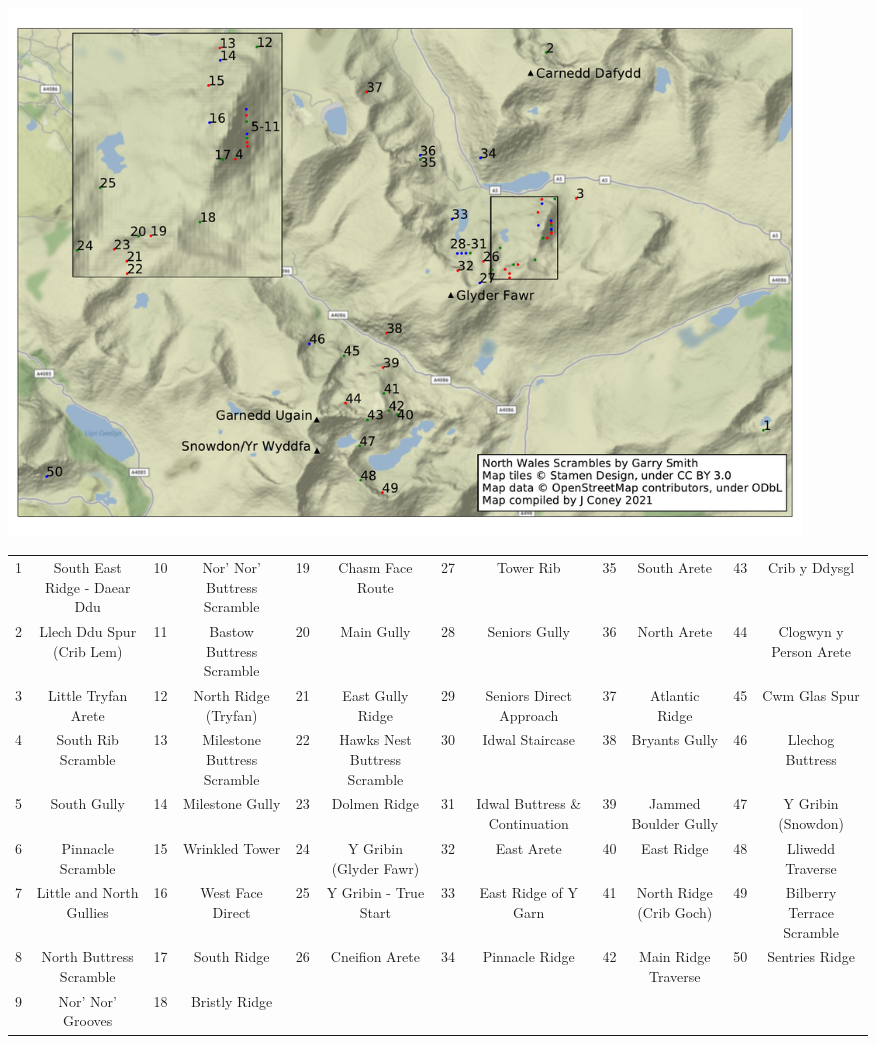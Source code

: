 \documentclass{article}
\begin{document}
\begin{centering}
\includegraphics[width=210mm]{scrambles_summits.pdf}

\tiny
\begin{tabular}{cc|cc|cc|cc|cc|cc}
1&	South East Ridge - Daear Ddu &	10	&Nor' Nor' Buttress Scramble&	19&	Chasm Face Route&	27&	Tower Rib&	35&	South Arete	&43&	Crib y Ddysgl\\
2&	Llech Ddu Spur (Crib Lem)&	11&	Bastow Buttress Scramble&	20&	Main Gully&	28&	Seniors Gully&	36&	North Arete&	44&	Clogwyn y Person Arete\\
3&	Little Tryfan Arete&	12&	North Ridge (Tryfan)&	21&	East Gully Ridge&	29&	Seniors Direct Approach&	37&	Atlantic Ridge&	45&	Cwm Glas Spur\\
4&	South Rib Scramble&	13&	Milestone Buttress Scramble&	22&	Hawks Nest Buttress Scramble&	30&	Idwal Staircase&	38&	Bryants Gully&	46&	Llechog Buttress\\
5&	South Gully	&14&	Milestone Gully	&23&	Dolmen Ridge&	31&	Idwal Buttress \& Continuation&	39&	Jammed Boulder Gully&	47&	Y Gribin (Snowdon)\\
6&	Pinnacle Scramble&	15&	Wrinkled Tower&	24&	Y Gribin (Glyder Fawr)&	32&	East Arete&	40&	East Ridge&	48&	Lliwedd Traverse\\
7&	Little and North Gullies&	16&	West Face Direct&	25&	Y Gribin - True Start&	33&	East Ridge of Y Garn&	41&	North Ridge (Crib Goch)&	49&	Bilberry Terrace Scramble\\
8&	North Buttress Scramble&	17	&South Ridge	&26&	Cneifion Arete	&34	&Pinnacle Ridge	&42	&Main Ridge Traverse	&50&	Sentries Ridge\\
9&	Nor' Nor' Grooves&	18&	Bristly Ridge\\

\end{tabular}


\end{centering}
\end{document}
